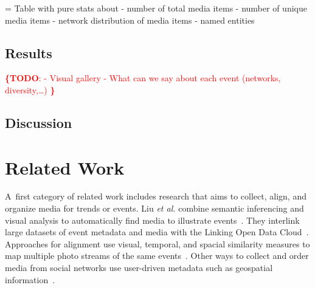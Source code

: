 \documentclass{acm_proc_article-sp}
\let\oldemph\emph
\renewcommand{\emph}[1]{\oldemph{\fontsize{9}{9}\selectfont #1}}
\newcommand{\todo}[1]{\noindent\textcolor{red}{{\bf \{TODO}: #1{\bf \}}}}
\newenvironment{Todo}{\color{red}{\par{\bf TODO}}\everypar={\color{red}}{}}{}
\begin{document}
\begin{Todo}
Table with pure stats about
- number of total media items
- number of unique media items
- network distribution of media items 
- named entities

\end{Todo}

\subsection{Results}
\todo{
- Visual gallery
- What can we say about each event (networks, diversity,…)
}

\subsection{Discussion}

\section{Related Work} \label{sec:relatedwork}

A~first category of related work includes research that aims to collect, align, and organize media for trends or events.
Liu \emph{et al.} combine semantic inferencing and visual analysis to automatically find media to illustrate events~\cite{Liu2011}.
They interlink large datasets of event metadata and media with the Linking Open Data Cloud~\cite{LODcloud}.
Approaches for alignment use visual, temporal, and spacial similarity measures to map multiple photo streams of the same events~\cite{Yang2011}.
Other ways to collect and order media from social networks use user-driven metadata such as geospatial information~\cite{Crandall}.
\end{document}
